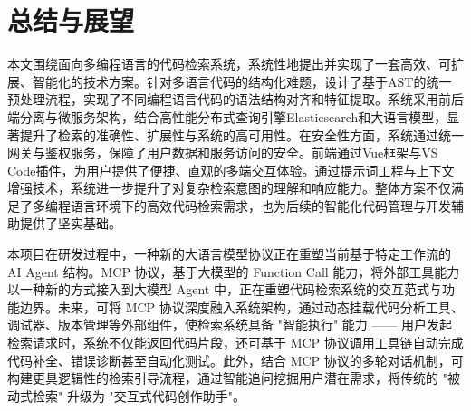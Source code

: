 \documentclass[UTF8,a4paper,12pt]{ctexart}
\numberwithin{equation}{section}
\begin{document}
\renewcommand\refname{总结与展望}
\section*{总结与展望}
本文围绕面向多编程语言的代码检索系统，系统性地提出并实现了一套高效、可扩展、智能化的技术方案。针对多语言代码的结构化难题，设计了基于AST的统一预处理流程，实现了不同编程语言代码的语法结构对齐和特征提取。系统采用前后端分离与微服务架构，结合高性能分布式查询引擎Elasticsearch和大语言模型，显著提升了检索的准确性、扩展性与系统的高可用性。在安全性方面，系统通过统一网关与鉴权服务，保障了用户数据和服务访问的安全。前端通过Vue框架与VS Code插件，为用户提供了便捷、直观的多端交互体验。通过提示词工程与上下文增强技术，系统进一步提升了对复杂检索意图的理解和响应能力。整体方案不仅满足了多编程语言环境下的高效代码检索需求，也为后续的智能化代码管理与开发辅助提供了坚实基础。\par
本项目在研发过程中，一种新的大语言模型协议正在重塑当前基于特定工作流的 AI Agent 结构。MCP 协议，基于大模型的 Function Call 能力，将外部工具能力以一种新的方式接入到大模型 Agent 中，正在重塑代码检索系统的交互范式与功能边界。未来，可将 MCP 协议深度融入系统架构，通过动态挂载代码分析工具、调试器、版本管理等外部组件，使检索系统具备 "智能执行" 能力 —— 用户发起检索请求时，系统不仅能返回代码片段，还可基于 MCP 协议调用工具链自动完成代码补全、错误诊断甚至自动化测试。此外，结合 MCP 协议的多轮对话机制，可构建更具逻辑性的检索引导流程，通过智能追问挖掘用户潜在需求，将传统的 "被动式检索" 升级为 "交互式代码创作助手"。\par

\newpage
{}

\renewcommand\refname{参考文献}

\end{document}

